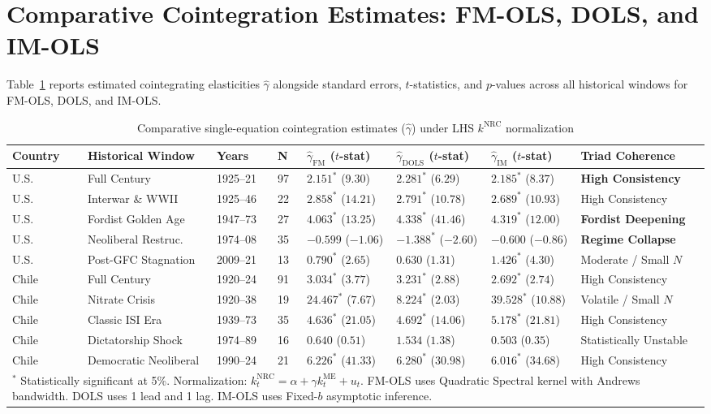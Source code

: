 \documentclass[11pt,a4paper]{article}
\begin{document}
\FloatBarrier
\section{Comparative Cointegration Estimates: FM-OLS, DOLS, and IM-OLS}

Table~\ref{tab:cointreg_triad_ledger} reports estimated cointegrating elasticities $\hat{\gamma}$ alongside standard errors, $t$-statistics, and $p$-values across all historical windows for FM-OLS, DOLS, and IM-OLS.

\begin{table}[h!]
\centering
\small
\caption{Comparative single-equation cointegration estimates ($\hat{\gamma}$) under LHS $k^{\text{NRC}}$ normalization}
\label{tab:cointreg_triad_ledger}
\begin{tabular}{p{1.4cm} p{2.8cm} p{0.5cm} p{0.6cm} p{1.6cm} p{1.6cm} p{1.6cm} p{2.0cm}}
\toprule
\textbf{Country} & \textbf{Historical Window} & \textbf{Years} & \textbf{N} & \textbf{$\hat{\gamma}_{\text{FM}}$ ($t$-stat)} & \textbf{$\hat{\gamma}_{\text{DOLS}}$ ($t$-stat)} & \textbf{$\hat{\gamma}_{\text{IM}}$ ($t$-stat)} & \textbf{Triad Coherence} \\
\midrule
U.S. & Full Century & 1925--21 & 97 & $2.151^*$ ($9.30$) & $2.281^*$ ($6.29$) & $2.185^*$ ($8.37$) & \textbf{High Consistency} \\
U.S. & Interwar \& WWII & 1925--46 & 22 & $2.858^*$ ($14.21$) & $2.791^*$ ($10.78$) & $2.689^*$ ($10.93$) & High Consistency \\
U.S. & Fordist Golden Age & 1947--73 & 27 & $4.063^*$ ($13.25$) & $4.338^*$ ($41.46$) & $4.319^*$ ($12.00$) & \textbf{Fordist Deepening} \\
U.S. & Neoliberal Restruc. & 1974--08 & 35 & $-0.599$ ($-1.06$) & $-1.388^*$ ($-2.60$) & $-0.600$ ($-0.86$) & \textbf{Regime Collapse} \\
U.S. & Post-GFC Stagnation & 2009--21 & 13 & $0.790^*$ ($2.65$) & $0.630$ ($1.31$) & $1.426^*$ ($4.30$) & Moderate / Small $N$ \\
\midrule
Chile & Full Century & 1920--24 & 91 & $3.034^*$ ($3.77$) & $3.231^*$ ($2.88$) & $2.692^*$ ($2.74$) & High Consistency \\
Chile & Nitrate Crisis & 1920--38 & 19 & $24.467^*$ ($7.67$) & $8.224^*$ ($2.03$) & $39.528^*$ ($10.88$) & Volatile / Small $N$ \\
Chile & Classic ISI Era & 1939--73 & 35 & $4.636^*$ ($21.05$) & $4.692^*$ ($14.06$) & $5.178^*$ ($21.81$) & High Consistency \\
Chile & Dictatorship Shock & 1974--89 & 16 & $0.640$ ($0.51$) & $1.534$ ($1.38$) & $0.503$ ($0.35$) & Statistically Unstable \\
Chile & Democratic Neoliberal & 1990--24 & 21 & $6.226^*$ ($41.33$) & $6.280^*$ ($30.98$) & $6.016^*$ ($34.68$) & High Consistency \\
\bottomrule
\multicolumn{8}{p{14.2cm}}{\footnotesize $^*$ Statistically significant at 5\%. Normalization: $k_t^{\text{NRC}} = \alpha + \gamma k_t^{\text{ME}} + u_t$. FM-OLS uses Quadratic Spectral kernel with Andrews bandwidth. DOLS uses 1 lead and 1 lag. IM-OLS uses Fixed-$b$ asymptotic inference.}
\end{tabular}
\end{table}
\end{document}

